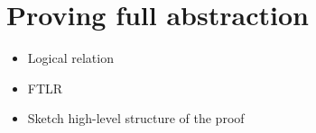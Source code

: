 \documentclass[acmsmall,review,anonymous]{acmart}\settopmatter{printfolios=true,printccs=false,printacmref=false}
\newcommand{\srccm}{\textsc{oLCM}}
\begin{document}





\section{Proving full abstraction}
\label{sec:fa-proof}

\begin{itemize}
\item Logical relation
\item FTLR
\item Sketch high-level structure of the proof
\end{itemize}
\end{document}

